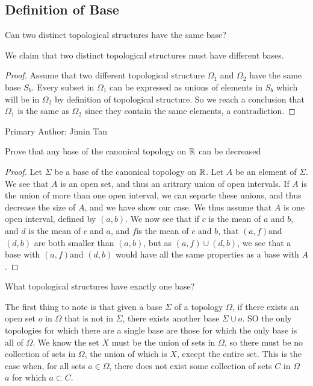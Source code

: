\subsection{Definition of Base}
\begin{minorEx} %
Can two distinct topological structures have the same base?
\end{minorEx}

We claim that two distinct topological structures must have different bases.

\begin{proof}
Assume that two different topological structure $\Omega_1$ and $\Omega_2$ have the same base $S_b$. Every subset in $\Omega_1$ can be expressed as unions of elements in $S_b$ which will be in $\Omega_2$ by definition of topological structure. So we reach a conclusion that $\Omega_1$ is the same as $\Omega_2$ since they contain the same elements, a contradiction.
\end{proof}

Primary Author: Jimin Tan

\begin{minorEx}[Riddle]%
  Prove that any base of the canonical topology on $\mathbb{R}$ can be decreased
\end{minorEx}
\begin{proof}
  Let $\Sigma$ be a base of the canonical topology on $\mathbb{R}$. Let $A$ be an element of 
  $\Sigma$. We see that $A$ is an open set, and thus an aritrary union of open intervals. If $A$ is the union of more than one open interval, we can separte these unions, and thus decrease the size of $A$, and we have show our case. We thus assume that $A$ is one open interval, defined by $(a,b)$. We now see that if $c$ is the mean of $a$ and $b$, and $d$ is the mean of $c$ and $a$, and $f$is the mean of $c$ and $b$, that $(a,f)$and 
  $(d,b)$ are both smaller than $(a,b)$, but as $(a,f) \cup (d,b)$, we see that a base with $(a,f)$and 
  $(d,b)$ would have all the same properties as a base with $A$.
\end{proof}

\begin{minorEx}[Riddle]%
What topological structures have exactly one base?
\end{minorEx}
The first thing to note is that given a base $\Sigma$ of a topology $\Omega$, if there exists an open set $o$ in $\Omega$ that is not in $\Sigma$, there exists another base $\Sigma \cup o$. SO the only topologies for which there are a single base are those for which the only base is all of $\Omega$. We know the set $X$ must be the union of sets in $\Omega$, so there must be no collection of sets in $\Omega$, the union of which is $X$, except the entire set. This is the case when, for all sets $a \in \Omega$, there does not exist some collection of sets $C$ in $\Omega$ \ $a$ for which $a \subset C$.
